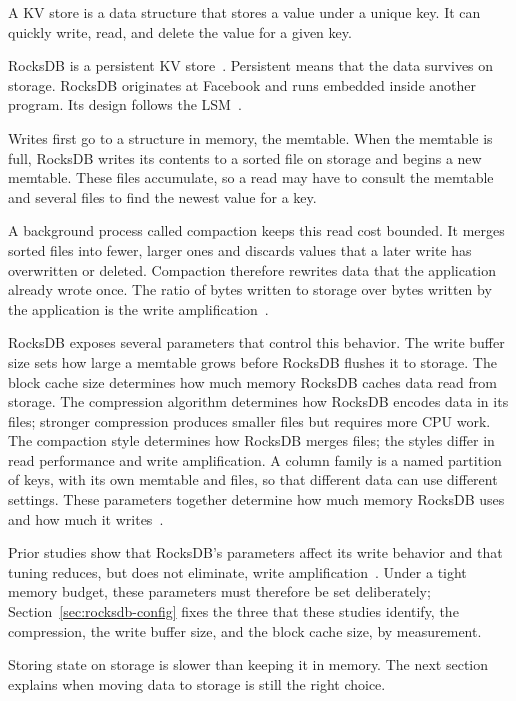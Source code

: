 A \ac{KV} store is a data structure that stores a value under a unique key.
It can quickly write, read, and delete the value for a given key.

RocksDB is a persistent \ac{KV} store~\cite{borthakur2013}.
Persistent means that the data survives on storage.
RocksDB originates at Facebook and runs embedded inside another program.
Its design follows the \ac{LSM}~\cite{oneil1996}.

Writes first go to a structure in memory, the memtable.
When the memtable is full, RocksDB writes its contents to a sorted file on storage and begins a new memtable.
These files accumulate, so a read may have to consult the memtable and several files to find the newest value for a key.

A background process called compaction keeps this read cost bounded.
It merges sorted files into fewer, larger ones and discards values that a later write has overwritten or deleted.
Compaction therefore rewrites data that the application already wrote once.
The ratio of bytes written to storage over bytes written by the application is the write amplification~\cite{jin2022,wei2025}.

RocksDB exposes several parameters that control this behavior.
The write buffer size sets how large a memtable grows before RocksDB flushes it to storage.
The block cache size determines how much memory RocksDB caches data read from storage.
The compression algorithm determines how RocksDB encodes data in its files; stronger compression produces smaller files but requires more CPU work.
The compaction style determines how RocksDB merges files; the styles differ in read performance and write amplification.
A column family is a named partition of keys, with its own memtable and files, so that different data can use different settings.
These parameters together determine how much memory RocksDB uses~\cite{rocksdb-memory} and how much it writes~\cite{jin2022,wei2025}.

Prior studies show that RocksDB's parameters affect its write behavior and that tuning reduces, but does not eliminate, write amplification~\cite{jin2022,wei2025}.
Under a tight memory budget, these parameters must therefore be set deliberately; Section~\ref{sec:rocksdb-config} fixes the three that these studies identify, the compression, the write buffer size, and the block cache size, by measurement.

Storing state on storage is slower than keeping it in memory.
The next section explains when moving data to storage is still the right choice.


